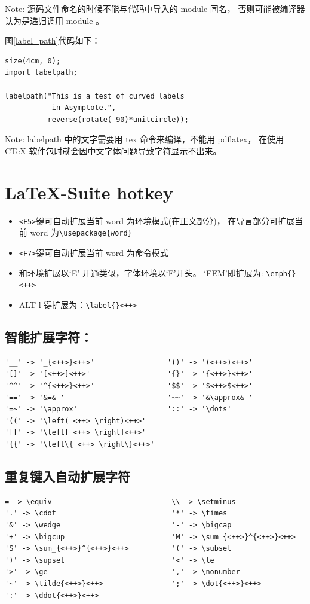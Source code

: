 \documentclass[a4paper,11pt]{article}
\begin{document}
Note: 源码文件命名的时候不能与代码中导入的 module 同名，
否则可能被编译器认为是递归调用 module 。

图\ref{label_path}代码如下：
\begin{Verbatim}
size(4cm, 0);
import labelpath;

labelpath("This is a test of curved labels
           in Asymptote.",
          reverse(rotate(-90)*unitcircle));
\end{Verbatim}

Note: labelpath 中的文字需要用 tex 命令来编译，不能用 pdflatex，
在使用 CTeX 软件包时就会因中文字体问题导致字符显示不出来。

\section{\LaTeX -Suite hotkey}
\begin{itemize}
\item \verb+<F5>+键可自动扩展当前 word 为环境模式(在正文部分)，
在导言部分可扩展当前 word 为\verb+\usepackage{word}+
\item \verb+<F7>+键可自动扩展当前 word 为命令模式
\item 和环境扩展以`E' 开通类似，字体环境以`F'开头。
	`FEM'即扩展为: \verb|\emph{}<++>|
\item ALT-l 键扩展为：\verb|\label{}<++>|
\end{itemize}

\subsection{智能扩展字符：}
\begin{Verbatim}
'__' -> '_{<++>}<++>'                 '()' -> '(<++>)<++>'
'[]' -> '[<++>]<++>'                  '{}' -> '{<++>}<++>'
'^^' -> '^{<++>}<++>'                 '$$' -> '$<++>$<++>'
'==' -> '&=& '                        '~~' -> '&\approx& '
'=~' -> '\approx'                     '::' -> '\dots'
'((' -> '\left( <++> \right)<++>'
'[[' -> '\left[ <++> \right]<++>'
'{{' -> '\left\{ <++> \right\}<++>'
\end{Verbatim}

\subsection{重复键入自动扩展字符}
\begin{Verbatim}
= -> \equiv                            \\ -> \setminus
'.' -> \cdot                           '*' -> \times
'&' -> \wedge                          '-' -> \bigcap
'+' -> \bigcup                         'M' -> \sum_{<++>}^{<++>}<++>
'S' -> \sum_{<++>}^{<++>}<++>          '(' -> \subset
')' -> \supset                         '<' -> \le
'>' -> \ge                             ',' -> \nonumber
'~' -> \tilde{<++>}<++>                ';' -> \dot{<++>}<++>
':' -> \ddot{<++>}<++>
\end{Verbatim}
\end{document}
